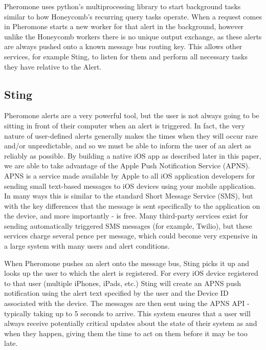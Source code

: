 Pheromone uses python's multiprocessing library to start background tasks
similar to how Honeycomb’s recurring query tasks operate. When a request comes
in Pheromone starts a new worker for that alert in the background, however
unlike the Honeycomb workers there is no unique output exchange, as these
alerts are always pushed onto a known message bus routing key. This allows
other services, for example Sting, to listen for them and perform all necessary
tasks they have relative to the Alert.

\subsection{Sting}

Pheromone alerts are a very powerful tool, but the user is not always going to
be sitting in front of their computer when an alert is triggered. In fact, the
very nature of user-defined alerts generally makes the times when they will
occur rare and/or unpredictable, and so we must be able to inform the user of
an alert as reliably as possible. By building a native iOS app as described
later in this paper, we are able to take advantage of the Apple Push
Notification Service (APNS). APNS is a service made available by Apple to all
iOS application developers for sending small text-based messages to iOS devices
using your mobile application. In many ways this is similar to the standard
Short Message Service (SMS), but with the key differences that the message is
sent specifically to the application on the device, and more importantly - is
free. Many third-party services exist for sending automatically triggered SMS
messages (for example, Twilio), but these services charge several pence per
message, which could become very expensive in a large system with many users
and alert conditions.

When Pheromone pushes an alert onto the message bus, Sting picks it up and
looks up the user to which the alert is registered. For every iOS device
registered to that user (multiple iPhones, iPads, etc.) Sting will create an
APNS push notification using the alert text specified by the user and the
Device ID associated with the device. The messages are then sent using the
APNS API - typically taking up to 5 seconds to arrive. This system ensures
that a user will always receive potentially critical updates about the state
of their system as and when they happen, giving them the time to act on them
before it may be too late.
